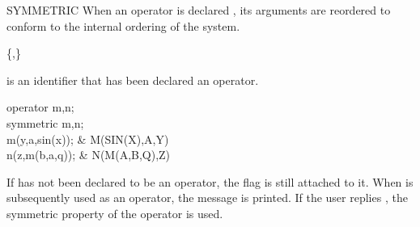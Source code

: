 \begin{Declaration}[symmetric]{SYMMETRIC}
When an operator is declared , its arguments are reordered
to conform to the internal ordering of the system.  
\begin{Syntax}
 \{,\}\optional
\end{Syntax}

 is an identifier that has been declared an operator.

\begin{Examples}
operator m,n; \\
symmetric m,n; \\
m(y,a,sin(x));               &           M(SIN(X),A,Y) \\
n(z,m(b,a,q));               &           N(M(A,B,Q),Z)
\end{Examples}

\begin{Comments}
If  has not been declared to be an operator, the flag
 is still attached to it.  When  is
subsequently used as an operator, the message 
  is printed.  If the user replies , the
symmetric property of the operator is used.
\end{Comments}
\end{Declaration}


